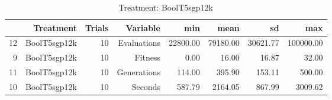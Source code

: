 \begin{table}[ht]
\centering
\begin{tabular}{rrrrrrrr}
  \hline
 & Treatment & Trials & Variable & min & mean & sd & max \\ 
  \hline
12 & BoolT5sgp12k &  10 & Evaluations & 22800.00 & 79180.00 & 30621.77 & 100000.00 \\ 
  9 & BoolT5sgp12k &  10 & Fitness & 0.00 & 16.00 & 16.87 & 32.00 \\ 
  11 & BoolT5sgp12k &  10 & Generations & 114.00 & 395.90 & 153.11 & 500.00 \\ 
  10 & BoolT5sgp12k &  10 & Seconds & 587.79 & 2164.05 & 867.99 & 3009.62 \\ 
   \hline
\end{tabular}
\caption{Treatment: BoolT5sgp12k} 
\end{table}

